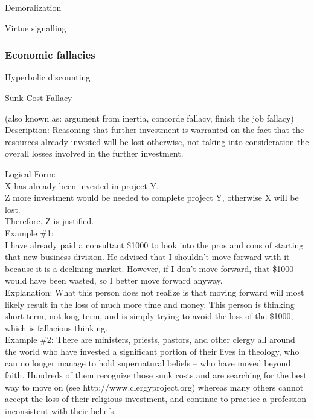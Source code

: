 \documentclass[a4paper,12pt,single,pdftex]{scrartcl}
\begin{document}
Demoralization

Virtue signalling\subsubsection{Economic fallacies}


Hyperbolic discounting

Sunk-Cost Fallacy
    
      (also known as: argument from inertia, concorde fallacy, finish the job fallacy)
    \\

  
    Description: Reasoning that further investment is warranted on the fact that the resources already invested will be lost otherwise, not taking into consideration the overall losses involved in the further investment.

    
      Logical Form:
    \\

    
      X has already been invested in project Y.
    \\

    
      Z more investment would be needed to complete project Y, otherwise X will be lost.
    \\

    
      Therefore, Z is justified.
    \\

    
      Example \#1:
    \\

    
      I have already paid a consultant \$1000 to look into the pros and cons of starting that new business division.  He advised that I shouldn’t move forward with it because it is a declining market.  However, if I don’t move forward, that \$1000 would have been wasted, so I better move forward anyway.
    \\

    
      Explanation: What this person does not realize is that moving forward will most likely result in the loss of much more time and money.  This person is thinking short-term, not long-term, and is simply trying to avoid the loss of the \$1000, which is fallacious thinking.
    \\

    
      Example \#2: There are ministers, priests, pastors, and other clergy all around the world who have invested a significant portion of their lives in theology, who can no longer manage to hold supernatural beliefs -- who have moved beyond faith.  Hundreds of them recognize those sunk costs and are searching for the best way to move on (see http://www.clergyproject.org) whereas many others cannot accept the loss of their religious investment, and continue to practice a profession inconsistent with their beliefs.
    \\
\end{document}
